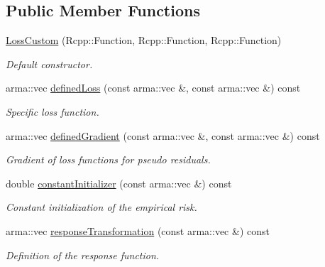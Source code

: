 \subsection*{Public Member Functions}
\begin{DoxyCompactItemize}
\item 
\hyperlink{classloss_1_1_loss_custom_a66d5f9be1b6096eded07a3e667d368ab}{Loss\+Custom} (Rcpp\+::\+Function, Rcpp\+::\+Function, Rcpp\+::\+Function)
\begin{DoxyCompactList}\small\item\em Default constructor. \end{DoxyCompactList}\item 
arma\+::vec \hyperlink{classloss_1_1_loss_custom_ad71351d35d7739651c487c2106571118}{defined\+Loss} (const arma\+::vec \&, const arma\+::vec \&) const
\begin{DoxyCompactList}\small\item\em Specific loss function. \end{DoxyCompactList}\item 
arma\+::vec \hyperlink{classloss_1_1_loss_custom_a91761ef42f85914dde2c3e6dd7fa1a0c}{defined\+Gradient} (const arma\+::vec \&, const arma\+::vec \&) const
\begin{DoxyCompactList}\small\item\em Gradient of loss functions for pseudo residuals. \end{DoxyCompactList}\item 
double \hyperlink{classloss_1_1_loss_custom_a0c8abe2bf210898813d2f9e5049cc1e8}{constant\+Initializer} (const arma\+::vec \&) const
\begin{DoxyCompactList}\small\item\em Constant initialization of the empirical risk. \end{DoxyCompactList}\item 
arma\+::vec \hyperlink{classloss_1_1_loss_custom_a42d9a0131836a056551c1073474cc8b9}{response\+Transformation} (const arma\+::vec \&) const
\begin{DoxyCompactList}\small\item\em Definition of the response function. \end{DoxyCompactList}\end{DoxyCompactItemize}
